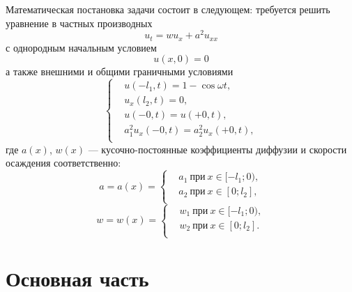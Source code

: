 \documentclass[12pt, a4paper]{article}
\begin{document}
Математическая постановка задачи состоит в следующем: требуется решить уравнение в частных производных
\begin{equation}
 u_t = wu_x + a^2 u_{xx} 
 \label{eq:12}
\end{equation}
с однородным начальным условием
\begin{equation}
 u(x,0) = 0 
\end{equation}
а также внешними и общими граничными условиями 
\begin{equation}
  \left\{
  \begin{aligned}
    & u(-l_1,t) = 1 - \cos \omega t, \\
    & u_x(l_2,t) = 0, \\
    & u(-0, t) = u(+0, t), \\
    & a_1^2 u_{x}(-0, t) = a_2^2 u_{x}(+0, t), \\
  \end{aligned}
  \right.
\end{equation}
где $a(x)$, $w(x)$ --- кусочно-постоянные коэффициенты диффузии и скорости осаждения соответственно:
\begin{equation}
  a=a(x)=\left\{ 
    \begin{aligned}
      & a_1\ \text{при}\ x \in [-l_1;0), \\
      & a_2\ \text{при}\ x \in [0;l_2], \\
    \end{aligned}
\right.
\end{equation}
\begin{equation}
  w=w(x)=\left\{ 
    \begin{aligned}
      & w_1\ \text{при}\ x \in [-l_1;0), \\
      & w_2\ \text{при}\ x \in [0;l_2]. \\
    \end{aligned}
\right.
\end{equation}
\section{Основная часть}
\end{document}
